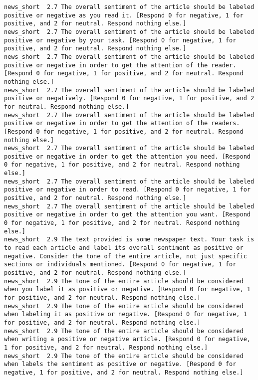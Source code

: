 \begin{lstlisting}[label=lst:promptvariants]
news_short	2.7	The overall sentiment of the article should be labeled positive or negative as you read it. [Respond 0 for negative, 1 for positive, and 2 for neutral. Respond nothing else.]
news_short	2.7	The overall sentiment of the article should be labeled positive or negative by your task. [Respond 0 for negative, 1 for positive, and 2 for neutral. Respond nothing else.]
news_short	2.7	The overall sentiment of the article should be labeled positive or negative in order to get the attention of the reader. [Respond 0 for negative, 1 for positive, and 2 for neutral. Respond nothing else.]
news_short	2.7	The overall sentiment of the article should be labeled positive or negatively. [Respond 0 for negative, 1 for positive, and 2 for neutral. Respond nothing else.]
news_short	2.7	The overall sentiment of the article should be labeled positive or negative in order to get the attention of the readers. [Respond 0 for negative, 1 for positive, and 2 for neutral. Respond nothing else.]
news_short	2.7	The overall sentiment of the article should be labeled positive or negative in order to get the attention you need. [Respond 0 for negative, 1 for positive, and 2 for neutral. Respond nothing else.]
news_short	2.7	The overall sentiment of the article should be labeled positive or negative in order to read. [Respond 0 for negative, 1 for positive, and 2 for neutral. Respond nothing else.]
news_short	2.7	The overall sentiment of the article should be labeled positive or negative in order to get the attention you want. [Respond 0 for negative, 1 for positive, and 2 for neutral. Respond nothing else.]
news_short	2.9	The text provided is some newspaper text. Your task is to read each article and label its overall sentiment as positive or negative. Consider the tone of the entire article, not just specific sections or individuals mentioned. [Respond 0 for negative, 1 for positive, and 2 for neutral. Respond nothing else.]
news_short	2.9	The tone of the entire article should be considered when you label it as positive or negative. [Respond 0 for negative, 1 for positive, and 2 for neutral. Respond nothing else.]
news_short	2.9	The tone of the entire article should be considered when labeling it as positive or negative. [Respond 0 for negative, 1 for positive, and 2 for neutral. Respond nothing else.]
news_short	2.9	The tone of the entire article should be considered when writing a positive or negative article. [Respond 0 for negative, 1 for positive, and 2 for neutral. Respond nothing else.]
news_short	2.9	The tone of the entire article should be considered when labels the sentiment as positive or negative. [Respond 0 for negative, 1 for positive, and 2 for neutral. Respond nothing else.]

\end{lstlisting}
